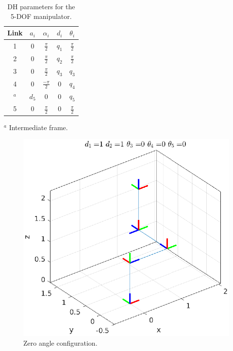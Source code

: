 \documentclass[a4paper,10pt]{article}
\begin{document}
\begin{table}[H]
\caption{DH parameters for the 5-DOF manipulator.}
\begin{center}
\label{table:simulation}
\begin{tabular}{c c c c c} \hline
Link & $a_i$ & $\alpha_i$       & $d_i$ & $\theta_i$      \\ \hline \hline
1    & 0     & $\frac{\pi}{2}$  & $q_1$ & $\frac{\pi}{2}$ \\
2    & 0     & $\frac{\pi}{2}$  & $q_2$ & $\frac{\pi}{2}$ \\
3    & 0     & $\frac{\pi}{2}$  & $q_3$ & $q_3$           \\
4    & 0     & $\frac{-\pi}{2}$ & 0     & $q_4$           \\
$^a$     & $d_5$ & 0                & 0     & $q_5$           \\
5    & 0     & $\frac{\pi}{2}$  & 0     & $\frac{\pi}{2}$ \\ \hline
\end{tabular}
\end{center}
\centering
\footnotesize{$^a$ Intermediate frame.}\\
\end{table}

\begin{figure}[H] \label{fig:conf0}
 \centering
 \includegraphics[width=0.7\linewidth]{configuration0.eps}
 \caption{Zero angle configuration.}
\end{figure}
\end{document}
